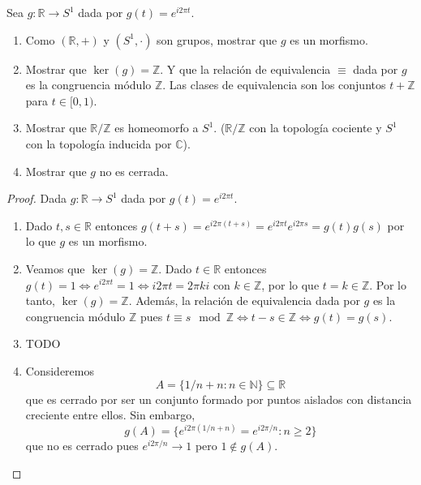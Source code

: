 \documentclass{article}
\theoremstyle{plain}
\theoremstyle{definition}
\newcommand{\R}{\mathbb{R}}
\newcommand{\Z}{\mathbb{Z}}
\newcommand{\N}{\mathbb{N}}
\newcommand{\C}{\mathbb{C}}
\newenvironment{ejercicio}[1]{\begin{trivlist}
\item[\hskip \labelsep {\bfseries Ejercicio}\hskip \labelsep {\bfseries #1.}]}{\end{trivlist}}
\begin{document}
\begin{ejercicio}{7}
    Sea \( g : \R \to S^1 \) dada por \( g(t) = e^{i2\pi t} \).
    \begin{enumerate}
        \item Como \( (\R, +) \) y \( (S^1, \cdot) \) son grupos, mostrar que \( g \) es un morfismo.
        \item Mostrar que \( \ker(g) = \Z \). Y que la relación de equivalencia \( \equiv \) dada por \( g \) es la congruencia módulo \( \Z \). Las clases de equivalencia son los conjuntos \( t + \Z \) para \( t \in [0, 1) \).
        \item Mostrar que \( \R/\Z \) es homeomorfo a \( S^1 \). (\( \R/\Z \) con la topología cociente y \( S^1 \) con la topología inducida por \( \C \)).
        \item Mostrar que \( g \) no es cerrada.
    \end{enumerate}
\end{ejercicio}
\begin{proof}
    Dada \( g : \R \to S^1 \) dada por \( g(t) = e^{i2\pi t} \).
    \begin{enumerate}
        \item Dado \( t, s \in \R \) entonces \( g(t+s) = e^{i2\pi (t+s)} = e^{i 2 \pi t} e^{i 2 \pi s} = g(t) g(s) \) por lo que \( g \) es un morfismo.
        \item Veamos que \( \ker(g) = \Z \). Dado \( t \in \R \) entonces \( g(t) = 1 \iff e^{i 2 \pi t} = 1 \iff i 2 \pi t = 2 \pi k i \) con \( k \in \Z \), por lo que \( t = k \in \Z \). Por lo tanto, \( \ker(g) = \Z \). Además, la relación de equivalencia dada por \( g \) es la congruencia módulo \( \Z \) pues \( t \equiv s \mod \Z \iff t - s \in \Z \iff g(t) = g(s) \).
        \item TODO
        \item Consideremos \[ A = \{ 1/n + n : n \in \N \} \subseteq \R \] que es cerrado por ser un conjunto formado por puntos aislados con distancia creciente entre ellos. Sin embargo, \[
                  g(A) = \{ e^{i 2 \pi (1/n + n)} = e^{i 2 \pi / n} : n \geq 2 \}
              \] que no es cerrado pues \( e^{i 2 \pi / n } \to 1 \) pero \( 1 \notin g(A) \).
    \end{enumerate}
\end{proof}
\end{document}
